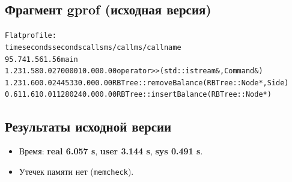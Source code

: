 \subsection{Фрагмент gprof (исходная версия)}
\begin{alltt}
Flat profile:
 time   seconds   seconds    calls  ms/call  ms/call  name
 95.74      1.56     1.56                             main
  1.23      1.58     0.02   700001     0.00     0.00  operator>>(std::istream&, Command&)
  1.23      1.60     0.02    44533     0.00     0.00  RBTree::removeBalance(RBTree::Node*, Side)
  0.61      1.61     0.01   128024     0.00     0.00  RBTree::insertBalance(RBTree::Node*)
\end{alltt}

\subsection{Результаты исходной версии}
\begin{itemize}
    \item Время: \textbf{real 6.057 s}, \textbf{user 3.144 s}, \textbf{sys 0.491 s}.
    \item Утечек памяти нет (\texttt{memcheck}).
\end{itemize}

\pagebreak